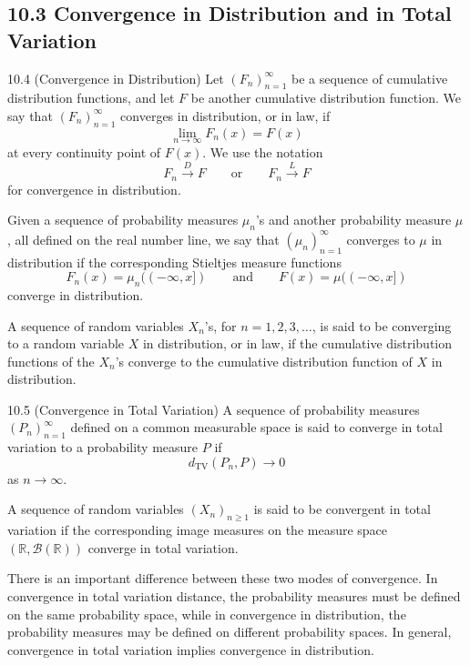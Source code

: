 \subsection*{10.3 Convergence in Distribution and in Total Variation}

\begin{defbox}{10.4 (Convergence in Distribution)}
Let $(F_n)_{n=1}^{\infty}$ be a sequence of cumulative distribution functions, and let $F$ be another cumulative distribution function. We say that $(F_n)_{n=1}^{\infty}$ converges in distribution, or in law, if
\[
\lim_{n\to\infty}F_n(x)=F(x)
\]
at every continuity point of $F(x)$. We use the notation
\[
F_n\xrightarrow{D}F
\qquad\text{or}\qquad
F_n\xrightarrow{L}F
\]
for convergence in distribution.

Given a sequence of probability measures $\mu_n$'s and another probability measure $\mu$, all defined on the real number line, we say that $(\mu_n)_{n=1}^{\infty}$ converges to $\mu$ in distribution if the corresponding Stieltjes measure functions
\[
F_n(x)=\mu_n((-\infty,x])
\qquad\text{and}\qquad
F(x)=\mu((-\infty,x])
\]
converge in distribution.

A sequence of random variables $X_n$'s, for $n=1,2,3,\ldots$, is said to be converging to a random variable $X$ in distribution, or in law, if the cumulative distribution functions of the $X_n$'s converge to the cumulative distribution function of $X$ in distribution.
\end{defbox}

\begin{defbox}{10.5 (Convergence in Total Variation)}
A sequence of probability measures $(P_n)_{n=1}^{\infty}$ defined on a common measurable space is said to converge in total variation to a probability measure $P$ if
\[
d_{\mathrm{TV}}(P_n,P)\to 0
\]
as $n\to\infty$.

A sequence of random variables $(X_n)_{n\geq 1}$ is said to be convergent in total variation if the corresponding image measures on the measure space $(\mathbb{R},\mathcal{B}(\mathbb{R}))$ converge in total variation.
\end{defbox}

There is an important difference between these two modes of convergence. In convergence in total variation distance, the probability measures must be defined on the same probability space, while in convergence in distribution, the probability measures may be defined on different probability spaces. In general, convergence in total variation implies convergence in distribution.

